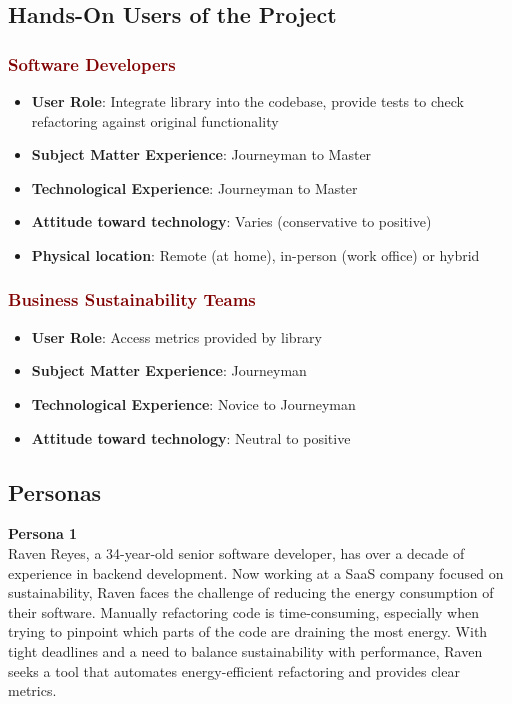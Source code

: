 \documentclass[12pt]{article}
\begin{document}
\subsection{Hands-On Users of the Project}
\subsubsection*{\textcolor{Maroon}{Software Developers}}
\begin{itemize}
  \item \textbf{User Role}: Integrate library into the codebase, provide tests to check refactoring against original functionality

  \item \textbf{Subject Matter Experience}: Journeyman to Master
  
  \item \textbf{Technological Experience}: Journeyman to Master
  
  \item \textbf{Attitude toward technology}: Varies (conservative to positive)
  
  \item \textbf{Physical location}: Remote (at home), in-person (work office) or hybrid
\end{itemize}

\subsubsection*{\textcolor{Maroon}{Business Sustainability Teams}}
\begin{itemize}
  \item \textbf{User Role}: Access metrics provided by library

  \item \textbf{Subject Matter Experience}: Journeyman

  \item \textbf{Technological Experience}: Novice to Journeyman
  
  \item \textbf{Attitude toward technology}: Neutral to positive

\end{itemize}

\subsection{Personas}

\textbf{Persona 1} \\
Raven Reyes, a 34-year-old senior software developer, has over a decade of experience in backend development. Now working at a SaaS company focused on sustainability, Raven faces the challenge of reducing the energy consumption of their software. Manually refactoring code is time-consuming, especially when trying to pinpoint which parts of the code are draining the most energy. With tight deadlines and a need to balance sustainability with performance, Raven seeks a tool that automates energy-efficient refactoring and provides clear metrics. \\
\end{document}
